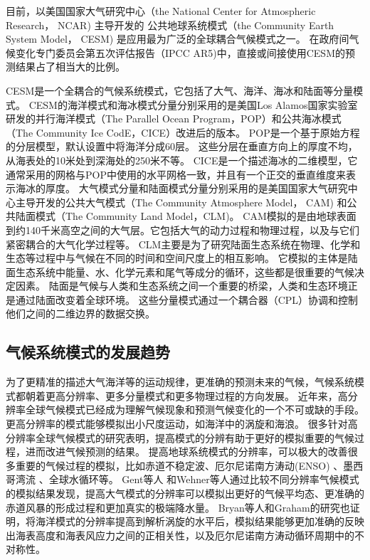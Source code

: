 目前，以美国国家大气研究中心（the National Center for Atmospheric Research， NCAR) 主导开发的
公共地球系统模式（the Community Earth System Model， CESM) 是应用最为广泛的全球耦合气候模式之一\cite{hurrell2013community}。
在政府间气候变化专门委员会第五次评估报告（IPCC AR5)中，直接或间接使用CESM的预测结果占了相当大的比例\cite{stocker2013ipcc}。
 

CESM是一个全耦合的气候系统模式，它包括了大气、海洋、海冰和陆面等分量模式。
CESM的海洋模式和海冰模式分量分别采用的是美国Los Alamos国家实验室研发的并行海洋模式（The Parallel Ocean Program，POP）和公共海冰模式（The Community Ice CodE，CICE）改进后的版本\cite{hurrell2013community}。
POP是一个基于原始方程的分层模型，默认设置中将海洋分成60层。
这些分层在垂直方向上的厚度不均，从海表处的10米处到深海处的250米不等。
CICE是一个描述海冰的二维模型，它通常采用的网格与POP中使用的水平网格一致，并且有一个正交的垂直维度来表示海冰的厚度。 
大气模式分量和陆面模式分量分别采用的是美国国家大气研究中心主导开发的公共大气模式（The Community Atmosphere Model， CAM) 和公共陆面模式（The Community Land Model，CLM)。 
CAM模拟的是由地球表面到约140千米高空之间的大气层。它包括大气的动力过程和物理过程，以及与它们紧密耦合的大气化学过程等。
CLM主要是为了研究陆面生态系统在物理、化学和生态等过程中与气候在不同的时间和空间尺度上的相互影响。
它模拟的主体是陆面生态系统中能量、水、化学元素和尾气等成分的循环，这些都是很重要的气候决定因素。
陆面是气候与人类和生态系统之间一个重要的桥梁，人类和生态环境正是通过陆面改变着全球环境。
这些分量模式通过一个耦合器（CPL）协调和控制他们之间的二维边界的数据交换\cite{liu2014c}。

 

\subsection{气候系统模式的发展趋势}

为了更精准的描述大气海洋等的运动规律，更准确的预测未来的气候，气候系统模式都朝着更高分辨率、更多分量模式和更多物理过程的方向发展\cite{stocker2013ipcc}。
近年来，高分辨率全球气候模式已经成为理解气候现象和预测气候变化的一个不可或缺的手段。
更高分辨率的模式能够模拟出小尺度运动，如海洋中的涡旋和海浪。 
很多针对高分辨率全球气候模式的研究表明，提高模式的分辨有助于更好的模拟重要的气候过程，进而改进气候预测的结果。
提高地球系统模式的分辨率，可以极大的改善很多重要的气候过程的模拟，比如赤道不稳定波\citep{roberts2009impact}、厄尔尼诺南方涛动(ENSO) \citep{shaffrey2009uk}、墨西哥湾流\citep{chassignet2008gulf, kuwano2010precipitation} 、全球水循环\citep{demory2014role}等。
Gent等人\cite{gent2010improvements} 和Wehner等人\cite{wehner2014effect}通过比较不同分辨率气候模式的模拟结果发现，提高大气模式的分辨率可以模拟出更好的气候平均态、更准确的赤道风暴的形成过程和更加真实的极端降水量。
Bryan等人\cite{bryan2010frontal}和Graham\cite{graham2014importance}的研究也证明，将海洋模式的分辨率提高到解析涡旋的水平后，模拟结果能够更加准确的反映出海表高度和海表风应力之间的正相关性，以及厄尔尼诺南方涛动循环周期中的不对称性。


